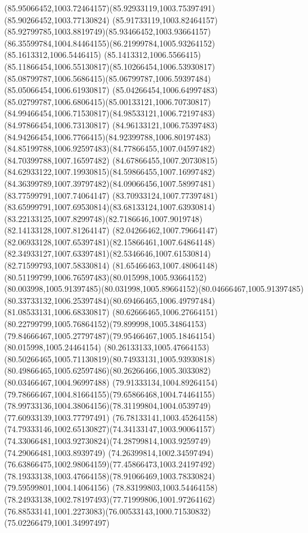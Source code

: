 {{\curveto(85.95066452,1003.72464157)(85.92933119,1003.75397491)(85.90266452,1003.77130824)
\curveto(85.91733119,1003.82464157)(85.92799785,1003.8819749)(85.93466452,1003.93664157)
\curveto(86.35599784,1004.84464155)(86.21999784,1005.93264152)(85.1613312,1006.5446415)
\curveto(85.1413312,1006.5566415)(85.11866454,1006.55130817)(85.10266454,1006.53930817)
\curveto(85.08799787,1006.5686415)(85.06799787,1006.59397484)(85.05066454,1006.61930817)
\curveto(85.04266454,1006.64997483)(85.02799787,1006.6806415)(85.00133121,1006.70730817)
\curveto(84.99466454,1006.71530817)(84.98533121,1006.72197483)(84.97866454,1006.73130817)
\curveto(84.96133121,1006.75397483)(84.94266454,1006.7766415)(84.92399788,1006.80197483)
\curveto(84.85199788,1006.92597483)(84.77866455,1007.04597482)(84.70399788,1007.16597482)
\curveto(84.67866455,1007.20730815)(84.62933122,1007.19930815)(84.59866455,1007.16997482)
\curveto(84.36399789,1007.39797482)(84.09066456,1007.58997481)(83.77599791,1007.74064147)
\curveto(83.70933124,1007.77397481)(83.65999791,1007.69530814)(83.68133124,1007.63930814)
\curveto(83.22133125,1007.8299748)(82.7186646,1007.9019748)(82.14133128,1007.81264147)
\curveto(82.04266462,1007.79664147)(82.06933128,1007.65397481)(82.15866461,1007.64864148)
\curveto(82.34933127,1007.63397481)(82.5346646,1007.61530814)(82.71599793,1007.58330814)
\curveto(81.65466463,1007.48064148)(80.51199799,1006.76597483)(80.015998,1005.93664152)
\curveto(80.003998,1005.91397485)(80.031998,1005.89664152)(80.04666467,1005.91397485)
\curveto(80.33733132,1006.25397484)(80.69466465,1006.49797484)(81.08533131,1006.68330817)
\curveto(80.62666465,1006.27664151)(80.22799799,1005.76864152)(79.899998,1005.34864153)
\curveto(79.84666467,1005.27797487)(79.95466467,1005.18464154)(80.015998,1005.24464154)
\curveto(80.26133133,1005.47664153)(80.50266465,1005.71130819)(80.74933131,1005.93930818)
\curveto(80.49866465,1005.62597486)(80.26266466,1005.3033082)(80.03466467,1004.96997488)
\curveto(79.91333134,1004.89264154)(79.78666467,1004.81664155)(79.65866468,1004.74464155)
\curveto(78.99733136,1004.38064156)(78.31199804,1004.0539749)(77.60933139,1003.77797491)
\curveto(76.78133141,1003.45264158)(74.79333146,1002.65130827)(74.34133147,1003.90064157)
\curveto(74.33066481,1003.92730824)(74.28799814,1003.9259749)(74.29066481,1003.8939749)
\curveto(74.26399814,1002.34597494)(76.63866475,1002.98064159)(77.45866473,1003.24197492)
\curveto(78.19333138,1003.47664158)(78.91066469,1003.78330824)(79.59599801,1004.14064156)
\curveto(78.83199803,1003.54464158)(78.24933138,1002.78197493)(77.71999806,1001.97264162)
\curveto(76.88533141,1001.2273083)(76.00533143,1000.71530832)(75.02266479,1001.34997497)
}}
